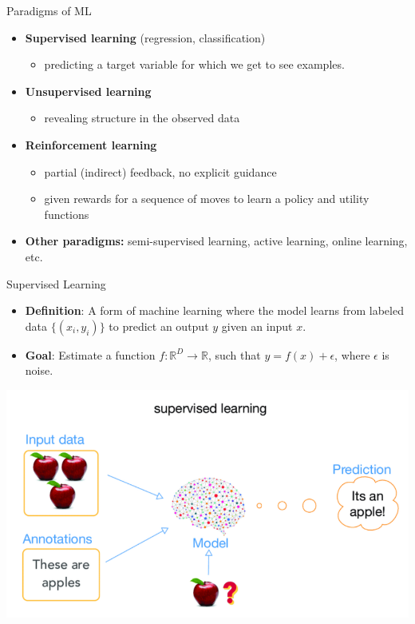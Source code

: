 \documentclass[serif, aspectratio=169]{beamer}
\begin{document}
    \begin{frame}{Paradigms of ML}

        \begin{minipage}{1.0\textwidth}
            \begin{itemize}
                \item \textbf{Supervised learning} (regression, classification)
                \begin{itemize}
                    \item predicting a target variable for which we get to see examples.
                \end{itemize}
                \item \textbf{Unsupervised learning}
                \begin{itemize}
                    \item revealing structure in the observed data
                \end{itemize}
                \item \textbf{Reinforcement learning}
                \begin{itemize}
                    \item partial (indirect) feedback, no explicit guidance
                    \item given rewards for a sequence of moves to learn a policy and utility functions
                \end{itemize}
                \item \textbf{Other paradigms:} semi-supervised learning, active learning, online learning, etc.
            \end{itemize}
        \end{minipage}%
    \end{frame}





    \begin{frame}{Supervised Learning}
        \begin{itemize}
            \item \textbf{Definition}: A form of machine learning where the model learns from labeled data \( \{(x_i, y_i)\} \) to predict an output \( y \) given an input \( x \).
            \item \textbf{Goal}: Estimate a function \( f: \mathbb{R}^D \rightarrow \mathbb{R} \), such that \( y = f(x) + \epsilon \), where \( \epsilon \) is noise.
        \end{itemize}
        \begin{center}
            \includegraphics[width=0.6\linewidth]{pic/supervised.png}
        \end{center}
    \end{frame}
\end{document}
